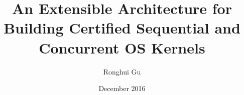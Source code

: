\documentclass[12pt]{yalephd}
\author{Ronghui Gu}
\title{An Extensible Architecture for Building
Certified Sequential and Concurrent OS Kernels}
\date{December 2016}
\numberwithin{lemma}{section}
\numberwithin{corollary}{section}
\numberwithin{definition}{section}
\numberwithin{theorem}{section}
\numberwithin{proposition}{section}
\numberwithin{invariant}{section}
\begin{document}

\maketitle
\makecopyright


%
\tableofcontents
\listoffigures
\mainmatter

%









\end{document}
